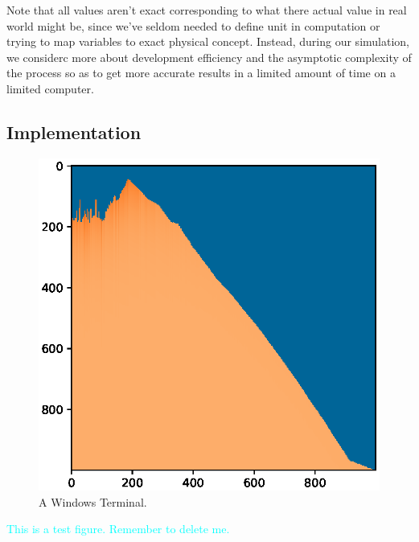 \documentclass[12pt]{article}
\begin{document}
Note that all values aren't exact corresponding to what there actual value in real world might be, since we've seldom needed to define unit in computation or trying to map variables to exact physical concept. Instead, during our simulation, we considerc more about development efficiency and the asymptotic complexity of the process so as to get more accurate results in a limited amount of time on a limited computer.

\subsection{Implementation}



\begin{figure}[H]
    \includegraphics[width=\linewidth]{Figure_1.eps}
    \caption{A Windows Terminal.}
    \label{fig:Terminal}
\end{figure}
\textcolor{cyan}{This is a test figure. Remember to delete me.}
\end{document}
